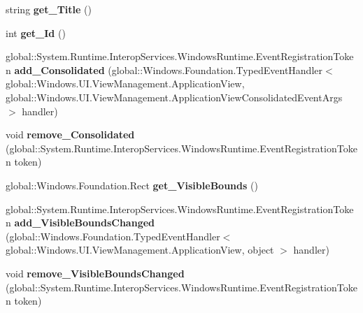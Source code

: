 \begin{DoxyCompactItemize}
string {\bfseries get\+\_\+\+Title} ()
\item 
\mbox{\label{class_windows_1_1_u_i_1_1_view_management_1_1_application_view_a4327352f99894f72219cfb4cad222952}} 
int {\bfseries get\+\_\+\+Id} ()
\item 
\mbox{\label{class_windows_1_1_u_i_1_1_view_management_1_1_application_view_a0ffeec110a4a66c247c6e2a9b4be797b}} 
global\+::\+System.\+Runtime.\+Interop\+Services.\+Windows\+Runtime.\+Event\+Registration\+Token {\bfseries add\+\_\+\+Consolidated} (global\+::\+Windows.\+Foundation.\+Typed\+Event\+Handler$<$ global\+::\+Windows.\+U\+I.\+View\+Management.\+Application\+View, global\+::\+Windows.\+U\+I.\+View\+Management.\+Application\+View\+Consolidated\+Event\+Args $>$ handler)
\item 
\mbox{\label{class_windows_1_1_u_i_1_1_view_management_1_1_application_view_a1c5d2a3b58064582c6456f48994b44d6}} 
void {\bfseries remove\+\_\+\+Consolidated} (global\+::\+System.\+Runtime.\+Interop\+Services.\+Windows\+Runtime.\+Event\+Registration\+Token token)
\item 
\mbox{\label{class_windows_1_1_u_i_1_1_view_management_1_1_application_view_aee267cf0554bac921b2c6c10392310b7}} 
global\+::\+Windows.\+Foundation.\+Rect {\bfseries get\+\_\+\+Visible\+Bounds} ()
\item 
\mbox{\label{class_windows_1_1_u_i_1_1_view_management_1_1_application_view_a1a4e9c3942d4eb2602fdeb123ed6f77a}} 
global\+::\+System.\+Runtime.\+Interop\+Services.\+Windows\+Runtime.\+Event\+Registration\+Token {\bfseries add\+\_\+\+Visible\+Bounds\+Changed} (global\+::\+Windows.\+Foundation.\+Typed\+Event\+Handler$<$ global\+::\+Windows.\+U\+I.\+View\+Management.\+Application\+View, object $>$ handler)
\item 
\mbox{\label{class_windows_1_1_u_i_1_1_view_management_1_1_application_view_a3c9197225cd620a40c58179a49da3349}} 
void {\bfseries remove\+\_\+\+Visible\+Bounds\+Changed} (global\+::\+System.\+Runtime.\+Interop\+Services.\+Windows\+Runtime.\+Event\+Registration\+Token token)

\end{DoxyCompactItemize}
